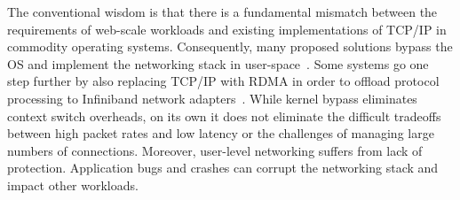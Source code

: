 
The conventional wisdom is that there is a fundamental mismatch
between the requirements of web-scale workloads and existing
implementations of TCP/IP in commodity operating
systems. Consequently, many proposed solutions bypass the OS and
implement the networking stack in
user-space~\cite{jeong2014mtcp,Kapoor:2012:CPL,openonload,marinos2013network,Thekkath:1993:INP}. Some
systems go one step further by also replacing TCP/IP with RDMA in
order to offload protocol processing to Infiniband network
adapters~\cite{DBLP:conf/sosp/OngaroRSOR11,Jose:2011:MDH,mitchell:rdma,dragojevic14farm}. While
kernel bypass eliminates context switch overheads, on its own it does
not eliminate the difficult tradeoffs between high packet rates and
low latency or the challenges of managing large numbers of
connections. Moreover, user-level networking suffers from lack of
protection. Application bugs and crashes can corrupt the networking
stack and impact other workloads.

